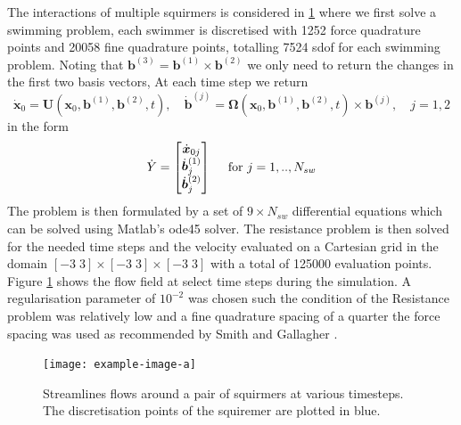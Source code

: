 The interactions of multiple squirmers is considered in \cref{fig:Squiremer3DFlowPair} where we first solve a swimming problem, each swimmer is discretised with 1252 force quadrature points and 20058 fine quadrature points, totalling 7524 sdof for each swimming problem. Noting that $\bm{b}^{(3)} = \bm{b}^{(1)} \times \bm{b}^{(2)}$ we only need to return the changes in the first two basis vectors, At each time step we return 
\begin{equation*}
    {\dot{\bm{x}}}_{0}=\bm{U}\left(\bm{x}_{0}, \bm{b}^{(1)}, \bm{b}^{(2)}, t\right), \quad \dot{\bm{b}}^{(j)}=\bm{\Omega}\left(\bm{x}_{0}, \bm{b}^{(1)}, \bm{b}^{(2)}, t\right) \times \bm{b}^{(j)}, \quad j=1,2
\end{equation*}
in the form
\begin{equation*}
\arraycolsep=0.4pt\def\arraystretch{1}
\dot{Y} = \begin{bmatrix}
    {\dot{\bm{x}}_{0 j}} \\
    {\dot{\bm{b}}^{(1)}}_j \\
    {\dot{\bm{b}}^{(2)}}_j
\end{bmatrix} \quad \text{ for } j=1,..,N_{sw}
\end{equation*}
The problem is then formulated by a set of $9 \times N_{sw}$ differential equations which can be solved using Matlab's ode45 solver. The resistance problem is then solved for the needed time steps and the velocity evaluated on a Cartesian grid in the domain $[-3\; 3] \times [-3\; 3] \times [-3\; 3]$ with a total of 125000 evaluation points. Figure \ref{fig:Squiremer3DFlowPair} shows the flow field at select time steps during the simulation. A regularisation parameter of $10^{-2}$ was chosen such the condition of the Resistance problem was relatively low and a fine quadrature spacing of a quarter the force spacing was used as recommended by Smith and Gallagher \cite{Gallagher2020}.  

\begin{figure}
    \centering
    \texttt{[image: example-image-a]}
    \caption[Streamlines flows around a pair of squirmers.]{Streamlines flows around a pair of squirmers at various timesteps. The discretisation points of the squiremer are plotted in blue.}
    \label{fig:Squiremer3DFlowPair}
\end{figure}

